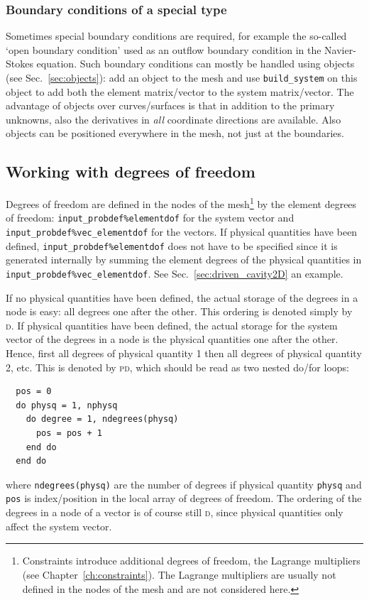 \subsubsection{Boundary conditions of a special type}

Sometimes special boundary conditions are required, for example the so-called 
`open boundary condition' used as an outflow boundary condition in the
Navier-Stokes equation. Such boundary conditions can mostly
be handled using objects
(see Sec.~\ref{sec:objects}):  add an object to the mesh and
use \texttt{build\_system} on this object
to add both the element matrix/vector to the system matrix/vector. The
advantage of objects over curves/surfaces is that in addition to the primary
unknowns, also the derivatives in \emph{all} coordinate directions are
available. Also objects can be positioned everywhere in the mesh, not just at
the boundaries.

\subsection{Working with degrees of freedom}

Degrees of freedom are defined in the nodes of the mesh\footnote{Constraints
introduce additional degrees of freedom, the Lagrange multipliers (see
Chapter~\ref{ch:constraints}). The Lagrange multipliers are usually not
defined in the nodes of the mesh and are not considered here.} by the element
degrees of freedom:
\texttt{input\_probdef\%elementdof} for the system vector and 
\texttt{input\_probdef\%vec\_elementdof} for the vectors. If physical
quantities have been defined, \texttt{input\_probdef\%elementdof} does not have
to be specified since it is generated
internally by summing the element degrees of the physical quantities in 
\texttt{input\_probdef\%vec\_elementdof}. See Sec.~\ref{sec:driven_cavity2D}
an example.
   
If no physical quantities have been defined,
the actual storage of the degrees in a node is easy: all degrees one after the
other. This ordering is denoted simply by \textsc{d}.
If physical quantities have been defined, the actual storage for the system
vector of the degrees in
a node is the physical quantities one after the other.
Hence, first all degrees of physical quantity 1 then all degrees of physical
quantity 2, etc. This is denoted by \textsc{pd}, which should be read as two
nested do/for loops:
\begin{verbatim}
  pos = 0
  do physq = 1, nphysq
    do degree = 1, ndegrees(physq)
      pos = pos + 1
    end do
  end do
\end{verbatim}
where \texttt{ndegrees(physq)} are the number of degrees if physical quantity
\texttt{physq} and \texttt{pos} is index/position in the local array of degrees
of freedom. The ordering of the degrees in a node of a vector is of course
still \textsc{d}, since physical quantities only affect the system vector.


